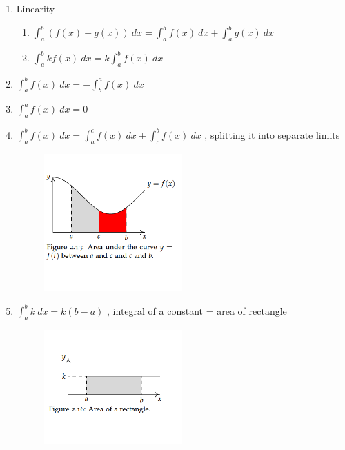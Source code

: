\documentclass[english,course]{Notes}
\begin{document}
\begin{enumerate}
	\item Linearity
	\begin{enumerate}
		\item {$\int_a^b \left( f(x) + g(x)\right) \ dx = \int_a^b f(x) \ dx + \int_a^b g(x) \ dx $}
		\item {$\int_a^b k f(x) \ dx = k \int_a^b f(x) \ dx$}
	\end{enumerate}
	
	\item {$\int_a^b f(x) \ dx = - \int_b^a f(x) \ dx $}
	\item{ $\int_a^a f(x) \ dx = 0$ \label{intprop:b}}
	\item {$\int_a^b f(x) \ dx = \int_a^c f(x) \ dx + \int_c^b f(x) \ dx$ , splitting it into separate limits}
	\begin{figure}[!h]
\centering
\includegraphics[width=0.5\textwidth]{intpropSplit}
\end{figure}

	\item{$\int_a^b k \ dx = k(b-a)$ , integral of a constant = area of rectangle}
	
\begin{figure}[!h]
\centering
\includegraphics[width=0.5\textwidth]{intpropConstant}
\end{figure}


\end{enumerate}
\end{document}
